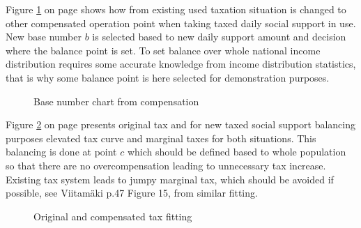 Figure \ref{fig:B2b1cris} on page \pageref{fig:B2b1cris}
shows how from existing used taxation situation is changed to other compensated operation point
when taking taxed daily social support in use.
New base number $b$ is selected based to new daily support amount
and decision where the balance point is set.
To set balance over whole national income distribution requires some accurate knowledge
from income distribution statistics,
that is why some balance point is here selected for demonstration purposes.
\begin{figure} %
 \begin{center}
  \caption{Base number chart from compensation}
  \label{fig:B2b1cris} 
 \end{center}
\end{figure}

Figure \ref{fig:BaseComp} on page \pageref{fig:BaseComp} presents original tax
and for new taxed social support balancing purposes elevated tax curve
and marginal taxes for both situations.
This balancing is done at point $c$ which should be defined based to whole population
so that there are no overcompensation leading to unnecessary tax increase.
Existing tax system leads to jumpy marginal tax, which should be avoided if possible,
see Viitam\"aki\cite{VM_46_2019} p.47 Figure 15, from similar fitting.
\begin{figure} %
 \begin{center}
  \caption{Original and compensated tax fitting}
  \label{fig:BaseComp}
 \end{center}
\end{figure}

